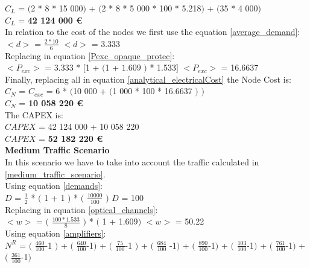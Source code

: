 $C_L$ = $($2 * 8 * 15 000$)$ + $($2 * 8 * 5 000 * 100 * 5.218$)$ + $($35 * 4 000$)$\\

$C_L$ = \textbf{42 124 000 \euro}\\

In relation to the cost of the nodes we first use the equation \ref{average_demand}:\\

$<d>$ = $\frac{2 * 10}{6}$ \qquad \qquad $<d>$ = 3.333\\

Replacing in equation \ref{Pexc_opaque_protec}:\\

$<P_{exc}>$ = 3.333 * $[$1 + $($1 + $1.609$ $)$ * 1.533$]$ \qquad \quad $<P_{exc}>$ = 16.6637 \\

Finally, replacing all in equation \ref{analytical_electricalCost} the Node Cost is:\\

$C_N$ = $C_{exc}$ = 6 * $($10 000 + $($1 000 * 100 * 16.6637 $)$ $)$\\

$C_N$ = \textbf{10 058 220 \euro}\\

The CAPEX is:\\
$CAPEX$ = 42 124 000 + 10 058 220\\

$CAPEX$ = \textbf{52 182 220 \euro}\\

\textbf{Medium Traffic Scenario}\\
In this scenario we have to take into account the traffic calculated in \ref{medium_traffic_scenario}.\\

Using equation \ref{demands}:\\

$D$ = $\frac{1}{2}$ * $($ 1 + 1 $)$ * $($ $\frac{10000}{100}$ $)$ \qquad \qquad $D$ = 100\\

Replacing in equation \ref{optical_channels}:\\

$<w>$ = $($ $\frac{100 * 1.533}{8}$ $)$ * $($ 1 + 1.609$)$ \qquad \qquad $<w>$ = 50.22\\

Using equation \ref{amplifiers}:\\

$N^R$ = $($ $\frac{460}{100}$-1 $)$ + $($ $\frac{640}{100}$-1$)$ + $($ $\frac{75}{100}$-1 $)$ + $($ $\frac{684}{100}$ -1$)$ + $($ $\frac{890}{100}$-1$)$ + $($ $\frac{103}{100}$-1$)$ + $($ $\frac{761}{100}$-1$)$ + $($ $\frac{361}{100}$-1$)$\\

